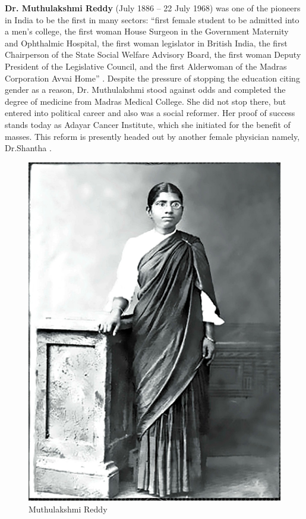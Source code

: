 \documentclass[a4paper,10pt]{article}
\begin{document}
\newblock
\textbf{Dr. Muthulakshmi Reddy} (July 1886 – 22 July 1968) was one of the pioneers in India to be the first in many sectors: ``first female student to be admitted into a men's college, the first woman House Surgeon in the Government Maternity and Ophthalmic Hospital, the first woman legislator in British India, the first Chairperson of the State Social Welfare Advisory Board, the first woman Deputy President of the Legislative Council, and the first Alderwoman of the Madras Corporation Avvai Home'' \cite{reddy}. Despite the pressure of stopping the education citing gender as a reason, Dr. Muthulakshmi stood against odds and completed the degree of medicine from Madras Medical College. She did not stop there, but entered into political career and also was a social reformer. Her proof of success stands today as Adayar Cancer Institute, which she initiated for the benefit of masses. This reform is presently headed out by another female physician namely, Dr.Shantha \cite{shantha}. 

\begin{center}
\begin{figure}[h]
\centering
 \includegraphics[scale=0.12]{reddy.jpg}
 \caption{Muthulakshmi Reddy}
\end{figure}
\end{center}
\end{document}
